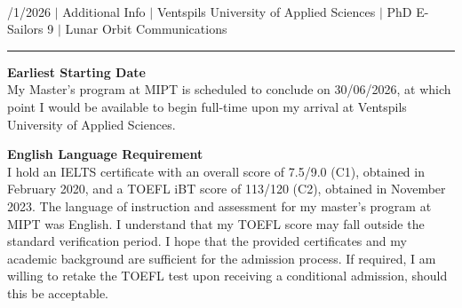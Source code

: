 \documentclass[a4paper,12pt]{article}
\begin{document}
{\centering
  {\scshape {}} \\
  {\fontsize{10}{10}/1/2026} $|$
  {\fontsize{10}{10}\selectfont Additional Info} $|$
  {\fontsize{10}{10}\selectfont Ventspils University of Applied Sciences} $|$
  {\fontsize{10}{10}\selectfont PhD E-Sailors 9} $|$
  {\fontsize{10}{10}\selectfont Lunar Orbit Communications}
\par}
\vspace{-20pt}
\noindent\rule{\textwidth}{0.5pt}

\vspace{-10pt}

\noindent \textbf{Earliest Starting Date}\\
My Master's program at MIPT is scheduled to conclude on 30/06/2026, at which point I would be available to begin full-time upon my arrival at Ventspils University of Applied Sciences.

\noindent \textbf{English Language Requirement}\\
I hold an IELTS certificate with an overall score of 7.5/9.0 (C1), obtained in February 2020, and a TOEFL iBT score of 113/120 (C2), obtained in November 2023. The language of instruction and assessment for my master’s program at MIPT was English. I understand that my TOEFL score may fall outside the standard verification period. I hope that the provided certificates and my academic background are sufficient for the admission process. If required, I am willing to retake the TOEFL test upon receiving a conditional admission, should this be acceptable.
\end{document}
